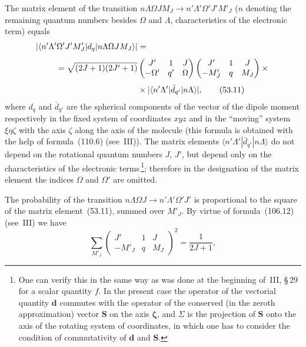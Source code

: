 The matrix element of the transition $n\Lambda\Omega J M_J \to n'\Lambda'\Omega'J'M'_J$ ($n$ denoting the remaining quantum numbers besides $\Omega$ and $\Lambda$, characteristics of the electronic term) equals
\begin{align}
|\langle n'\Lambda'\Omega'J'M'_J|d_q|n\Lambda\Omega JM_J\rangle| &={}\notag\\[4pt]
= \sqrt{(2J+1)(2J'+1)}&\begin{pmatrix} J' & 1 & J \\ -\Omega' & q' & \Omega\end{pmatrix}\begin{pmatrix} J' & 1 & J \\ -M'_J & q & M_J\end{pmatrix}\times{}\notag\\[4pt]
&\times|\langle n'\Lambda'|\bar{d}_{q'}|n\Lambda\rangle|,
\tag{53.11}
\end{align}
where $d_q$ and $\bar{d}_{q'}$ are the spherical components of the vector of the dipole moment respectively in the fixed system of coordinates $xyz$ and in the ``moving'' system $\xi\eta\zeta$ with the axis $\zeta$ along the axis of the molecule (this formula is obtained with the help of formula~(110.6) (see~III)). The matrix elements $\langle n'\Lambda'|\bar{d}_{q'}|n\Lambda\rangle$ do not depend on the rotational quantum numbers $J$, $J'$, but depend only on the characteristics of the electronic terms\,\footnote{One can verify this in the same way as was done at the beginning of~III, \S\,29 for a scalar quantity $f$. In the present case the operator of the vectorial quantity $\mathbf{d}$ commutes with the operator of the conserved (in the zeroth approximation) vector $\mathbf{S}$ on the axis $\boldsymbol{\zeta}$, and $\Sigma$ is the projection of $\mathbf{S}$ onto the axis of the rotating system of coordinates, in which one has to consider the condition of commutativity of $\mathbf{d}$ and $\mathbf{S}$.}; therefore in the designation of the matrix element the indices $\Omega$ and $\Omega'$ are omitted.

The probability of the transition $n\Lambda\Omega J \to n'\Lambda'\Omega'J'$ is proportional to the square of the matrix element~(53.11), summed over $M'_J$. By virtue of formula~(106.12) (see~III) we have
\[
\sum_{M'_J}\begin{pmatrix} J' & 1 & J \\ -M'_J & q & M_J\end{pmatrix}^{\!2} = \frac{1}{2J+1},
\]

